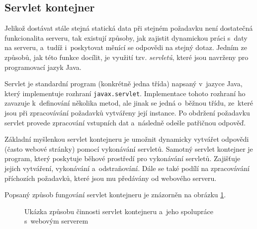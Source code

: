         \subsection{Servlet kontejner} \label{servletKontejner}
            Jelikož dostávat stále stejná statická data při stejném požadavku není dostatečná funkcionalita serveru,
            tak existují způsoby, jak zajistit dynamickou práci s~daty na serveru, a~tudíž i~poskytovat
            měnící se odpovědi na stejný dotaz.
            Jedním ze způsobů, jak této funkce docílit, je využití tzv. \emph{servletů},
            které jsou navrženy pro programovací jazyk Java.

            Servlet je standardní program (konkrétně jedna třída) napsaný v~jazyce Java, 
            který implementuje rozhraní \texttt{javax.servlet}.
            Implementace tohoto rozhraní ho zavazuje k~definování několika metod, ale jinak se jedná o~běžnou
            třídu, ze~které jsou při zpracovávání požadavků vytvářeny její instance. Po obdržení
            požadavku servlet provede zpracování vstupních dat a~následně odešle patřičnou odpověď.

            Základní myšlenkou servlet kontejneru je umožnit dynamicky vytvářet odpovědi (často webové stránky)
            pomocí vykonávání servletů. Samotný servlet kontejner je program, který poskytuje běhové prostředí pro vykonávání servletů.
            Zajišťuje jejich vytváření, vykonávání a~odstraňování. Dále se také podílí na zpracovávání příchozích požadavků, které jsou
            mu předávány od webového serveru. 

            Popsaný způsob fungování servlet kontejneru je znázorněn na obrázku \ref{imgServlet}.
            
            \begin{figure}[ht]
                \begin{center}
                    \caption{Ukázka způsobu činnosti servlet kontejneru a~jeho spolupráce s~webovým serverem}
                    \label{imgServlet}
                \end{center}
            \end{figure}   

